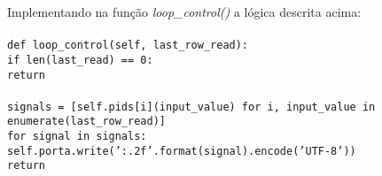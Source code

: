Implementando na função \emph{loop\_control()} a lógica descrita acima:
\\\\
\texttt{\footnotesize def loop\_control(self, last\_row\_read): \\
	\hspace*{8mm}if len(last\_read) == 0: \\
	\hspace*{8mm}\hspace*{8mm} return \\\\
	\hspace*{8mm}signals = [self.pids[i](input\_value) for i, input\_value in enumerate(last\_row\_read)] \\
	\hspace*{8mm}for signal in signals: \\
	\hspace*{8mm}\hspace*{8mm}self.porta.write('{:.2f}'.format(signal).encode('UTF-8')) \\
	\hspace*{8mm}return}
\\\\

